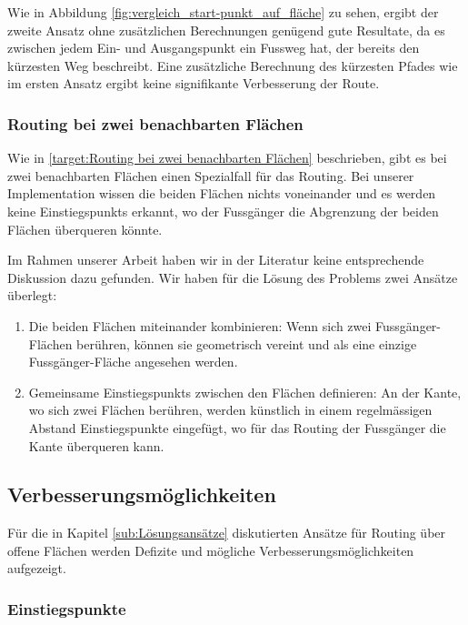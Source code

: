Wie in Abbildung \ref{fig:vergleich_start-punkt_auf_fläche} zu sehen, ergibt der zweite Ansatz ohne zusätzlichen Berechnungen genügend gute Resultate, da es zwischen jedem Ein- und Ausgangspunkt ein Fussweg hat, der bereits den kürzesten Weg beschreibt. Eine zusätzliche Berechnung des kürzesten Pfades wie im ersten Ansatz ergibt keine signifikante Verbesserung der Route.

\subsubsection{Routing bei zwei benachbarten Flächen}
\label{subsub:Routing bei zwei benachbarten Flächen}

Wie in \ref{target:Routing bei zwei benachbarten Flächen} beschrieben, gibt es bei zwei benachbarten Flächen einen Spezialfall für das Routing. Bei unserer Implementation wissen die beiden Flächen nichts voneinander und es werden keine \glspl{Einstiegspunkt} erkannt, wo der Fussgänger die Abgrenzung der beiden Flächen überqueren könnte.

Im Rahmen unserer Arbeit haben wir in der Literatur keine entsprechende Diskussion dazu gefunden. Wir haben für die Lösung des Problems zwei Ansätze überlegt:

\begin{enumerate}
    \item Die beiden Flächen miteinander kombinieren: Wenn sich zwei Fussgänger-Flächen berühren, können sie geometrisch vereint und als eine einzige Fussgänger-Fläche angesehen werden.
    \item Gemeinsame \glspl{Einstiegspunkt} zwischen den Flächen definieren: An der Kante, wo sich zwei Flächen berühren, werden künstlich in einem regelmässigen Abstand Einstiegspunkte eingefügt, wo für das Routing der Fussgänger die Kante überqueren kann.
\end{enumerate}

\subsection{Verbesserungsmöglichkeiten}
\label{sub:Verbesserungsmöglichkeiten}
Für die in Kapitel \ref{sub:Lösungsansätze} diskutierten Ansätze für Routing über offene Flächen werden Defizite und mögliche Verbesserungsmöglichkeiten aufgezeigt.

\subsubsection{Einstiegspunkte}
\label{subsub:Verbesserung_Einstiegspunkte}


